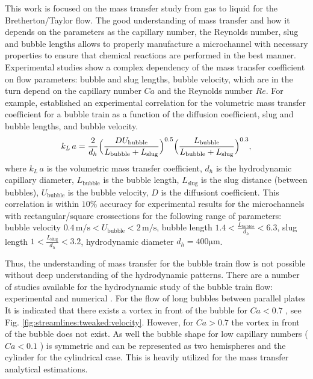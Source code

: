 \documentclass{article}
\newcommand{\vol}{k_L\,a}
\newcommand{\lbubble}{L_{\mathrm{bubble}}}
\newcommand{\lslug}{L_{\mathrm{slug}}}
\newcommand{\ububble}{U_{\mathrm{bubble}}}
\begin{document}
This work is focused on the mass transfer 
study from gas to liquid for the Bretherton/Taylor flow. The good understanding of mass transfer and how it depends on the
parameters as the capillary number, the Reynolds number, slug and bubble lengths allows to properly
manufacture a microchannel with necessary properties to ensure that chemical
reactions are performed in the best manner.  Experimental studies \cite{yue-mass,bercic} show a complex dependency of the mass transfer coefficient on flow parameters: bubble and slug lengths, bubble velocity, which are in the turn depend on the capillary number $Ca$ and the Reynolds number $Re$. For example,
\citet{yue-mass} established an experimental correlation for the volumetric mass transfer coefficient for a bubble train as
a function of the diffusion coefficient, slug and bubble lengths, and bubble velocity.  
\begin{equation}
\vol =\frac{2}{d_h} \Bigl(\frac{D
\ububble}{\lbubble+\lslug}\Bigr)^{0.5}
\Bigl(\frac{\lbubble}{\lbubble+\lslug}\Bigr)^{0.3},
\end{equation}
where $\vol$ is the volumetric mass transfer coefficient, $d_h$ is the hydrodynamic capillary
diameter, $\lbubble$ is the bubble length, $\lslug$ is the slug distance (between bubbles),
$\ububble$ is the bubble velocity, $D$ is the diffusiont coefficient. This correlation is within $10\%$ accuracy for experimental
results for the microchannels with rectangular/square crossections for the following range of
parameters: bubble velocity $0.4\,\mathrm{m/s}<\ububble<2\,\mathrm{m/s}$, bubble length
$1.4<\frac{\lbubble}{d_h}<6.3$, slug length $1<\frac{\lslug}{d_h}<3.2$,
hydrodynamic diameter $d_h = 400 \mathrm{\mu m}$.

Thus, the understanding of mass transfer for the bubble train flow is not possible without deep understanding of the hydrodynamic patterns. There are a number of studies available for the hydrodynamic study of the bubble train flow: experimental \citet{kreutzer-pressure-drop,cerro-space,cerro-bubble-train} and numerical \citet{wang-non-circular,kuzmin-binary3d,giavedoni-numerical,heil-threedim}. For the flow of long bubbles between parallel plates  It is indicated that  there exists a vortex in front of the bubble for $Ca<0.7$ , see Fig. \ref{fig:streamlines:tweaked:velocity}. However, for $Ca>0.7$ the vortex in front of the bubble does not exist. As well the bubble shape for low capillary numbers ($Ca<0.1$ \cite{cerro-bubble-train}) is symmetric and can be represented as two hemispheres and the cylinder for the cylindrical case. This is heavily utilized for the mass transfer analytical estimations.
\end{document}
